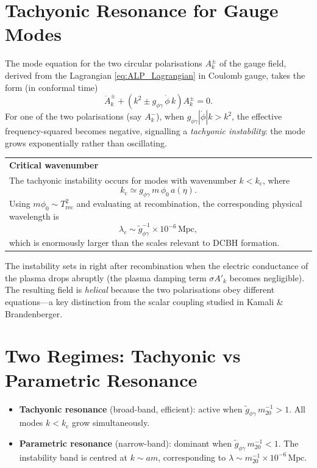 \documentclass[12pt,a4paper]{report}
\newenvironment{keyresult}[1][Key Result]{%
  \par\medskip\noindent
  \begin{tabular}{|p{\dimexpr\linewidth-2\tabcolsep-2\arrayrulewidth\relax}|}
  \hline
  \textbf{#1}\\[2pt]
}{%
  \\ \hline
  \end{tabular}
  \par\medskip
}
\newcommand{\kc}{k_{\mathrm{c}}}
\newcommand{\gag}{g_{\phi\gamma}}
\newcommand{\gtag}{\tilde{g}_{\phi\gamma}}
\newcommand{\phizero}{\phi_0}
\theoremstyle{definition}
\begin{document}
\section{Tachyonic Resonance for Gauge Modes}

The mode equation for the two circular polarisations $A_k^\pm$ of the gauge field,
derived from the Lagrangian \eqref{eq:ALP_Lagrangian} in Coulomb gauge, takes the
form (in conformal time)
\begin{equation}
  \ddot{A}_k^\pm + \left(k^2 \pm \gag\,\dot{\phi}\,k\right) A_k^\pm = 0.
  \label{eq:ALP_mode}
\end{equation}
For one of the two polarisations (say $A_k^-$), when $\gag|\dot\phi|k > k^2$,
the effective frequency-squared becomes negative, signalling a \emph{tachyonic
instability}: the mode grows exponentially rather than oscillating.

\begin{keyresult}[Critical wavenumber]
The tachyonic instability occurs for modes with wavenumber $k<\kc$, where
\begin{equation}
  \kc \simeq \gag\,m\,\phizero\,a(\eta).
  \label{eq:kc}
\end{equation}
Using $m\phizero\sim T_{\mathrm{rec}}^2$ and evaluating at recombination, the
corresponding physical wavelength is
\begin{equation}
  \lambda_c \sim \gtag^{-1}\times 10^{-6}\,\mathrm{Mpc},
\end{equation}
which is enormously larger than the scales relevant to DCBH formation.
\end{keyresult}

The instability sets in right after recombination when the electric conductance of
the plasma drops abruptly (the plasma damping term $\sigma A'_k$ becomes negligible).
The resulting field is \emph{helical} because the two polarisations obey different
equations---a key distinction from the scalar coupling studied in Kamali \&
Brandenberger.

\section{Two Regimes: Tachyonic vs Parametric Resonance}

\begin{itemize}
  \item \textbf{Tachyonic resonance} (broad-band, efficient): active when
    $\gtag\,m_{20}^{-1} > 1$. All modes $k < \kc$ grow simultaneously.
  \item \textbf{Parametric resonance} (narrow-band): dominant when
    $\gtag\,m_{20}^{-1} < 1$. The instability band is centred at
    $k\sim am$, corresponding to $\lambda\sim m_{20}^{-1}\times 10^{-6}\,\mathrm{Mpc}$.
\end{itemize}
\end{document}
